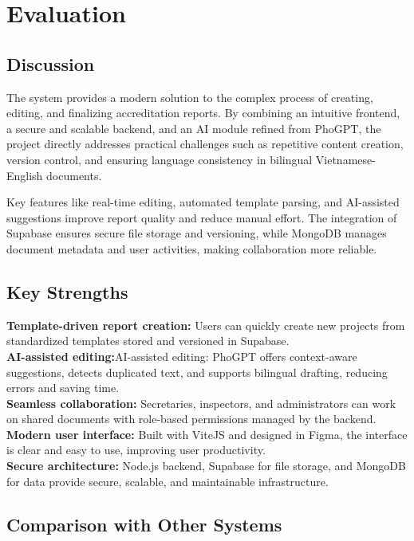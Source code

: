 \chapter{Evaluation}

\section{Discussion}
The system provides a modern solution to the complex process of creating, editing, and finalizing accreditation reports.
By combining an intuitive frontend, a secure and scalable backend, and an AI module refined from PhoGPT, the project directly addresses practical challenges such as repetitive content creation, version control, and ensuring language consistency in bilingual Vietnamese-English documents.

Key features like real-time editing, automated template parsing, and AI-assisted suggestions improve report quality and reduce manual effort.
The integration of Supabase ensures secure file storage and versioning, while MongoDB manages document metadata and user activities, making collaboration more reliable.

\section{Key Strengths}

\textbf{Template-driven report creation:}
Users can quickly create new projects from standardized templates stored and versioned in Supabase.
\\ 
\textbf{AI-assisted editing:}AI-assisted editing:
PhoGPT offers context-aware suggestions, detects duplicated text, and supports bilingual drafting, reducing errors and saving time.
\\
\textbf{Seamless collaboration:}
Secretaries, inspectors, and administrators can work on shared documents with role-based permissions managed by the backend.
\\
\textbf{Modern user interface:}
Built with ViteJS and designed in Figma, the interface is clear and easy to use, improving user productivity.
\\
\textbf{Secure architecture:}
Node.js backend, Supabase for file storage, and MongoDB for data provide secure, scalable, and maintainable infrastructure.

\section{Comparison with Other Systems}

